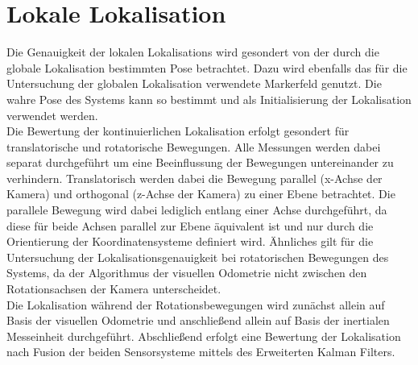 



\section{Lokale Lokalisation}%
Die Genauigkeit der lokalen Lokalisations wird gesondert von der durch die globale Lokalisation bestimmten Pose betrachtet. Dazu wird ebenfalls das für die Untersuchung der globalen Lokalisation verwendete Markerfeld genutzt. Die wahre Pose des Systems kann so bestimmt und als Initialisierung der Lokalisation verwendet werden.\\

Die Bewertung der kontinuierlichen Lokalisation erfolgt gesondert für translatorische und rotatorische Bewegungen. Alle Messungen werden dabei separat durchgeführt um eine Beeinflussung der Bewegungen untereinander zu verhindern. Translatorisch werden dabei die Bewegung parallel (x-Achse der Kamera) und orthogonal (z-Achse der Kamera) zu einer Ebene betrachtet. Die parallele Bewegung wird dabei lediglich entlang einer Achse durchgeführt, da diese für beide Achsen parallel zur Ebene äquivalent ist und nur durch die Orientierung der Koordinatensysteme definiert wird. Ähnliches gilt für die Untersuchung der Lokalisationsgenauigkeit bei rotatorischen Bewegungen des Systems, da der Algorithmus der visuellen Odometrie nicht zwischen den Rotationsachsen der Kamera unterscheidet.\\

Die Lokalisation während der Rotationsbewegungen wird zunächst allein auf Basis der visuellen Odometrie und anschließend allein auf Basis der inertialen Messeinheit durchgeführt. Abschließend erfolgt eine Bewertung der Lokalisation nach Fusion der beiden Sensorsysteme mittels des Erweiterten Kalman Filters.


